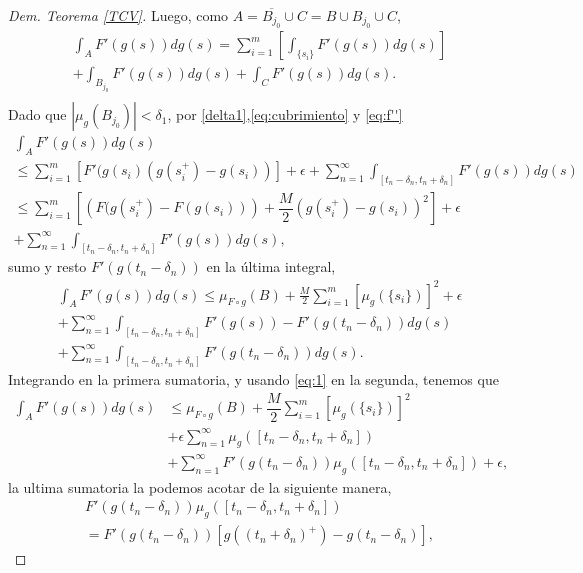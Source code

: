 \begin{proof}[Dem. Teorema \eqref{TCV}]
	Luego, como $A=\overline{B_{j_0}}\cup C=B\cup B_{j_0}\cup C$, 
	\begin{multline*}
		\int_{A}F'(g(s))dg(s)=\sum_{i=1}^{m}\left[ \int_{\{s_i\}}F'(g(s))dg(s)\right] \\+\int_{B_{j_0}}F'(g(s))dg(s)+\int_{C}F'(g(s))dg(s).\\
	\end{multline*}
Dado que  $|\mu_{g}(B_{j_0})|<\delta_1$, por \eqref{delta1},\eqref{eq:cubrimiento} y  \eqref{eq:f''}
		\begin{multline*}
			\int_{A}F'(g(s))dg(s)\\ \leq \sum_{i=1}^{m}\left[ F'(g(s_i)\left( g(s_i^+)-g(s_i)\right)  \right] +\epsilon+\sum_{n=1}^{\infty}\int_{[t_n-\delta_n, t_n+\delta_n]}F'(g(s))dg(s)\\ \leq 
		 \sum_{i=1}^{m}\left[ \left( F(g(s_i^+)-F(g(s_i))\right) +\dfrac{M}{2}\left( g(s_i^+)-g(s_i)\right)^2  \right] +\epsilon\\+\sum_{n=1}^{\infty}\int_{[t_n-\delta_n, t_n+\delta_n]}F'(g(s))dg(s),
\end{multline*}
sumo y resto $F'(g(t_n-\delta_n))$ en la última integral,
	\begin{multline*}
\int_{A}F'(g(s))dg(s) 
	\leq \mu_{F\circ g}(B)+\frac{M}{2}\sum_{i=1}^{m}\left[ \mu_{g}(\{s_i\})\right] ^2+\epsilon \\+ \sum_{n=1}^{\infty}\int_{[t_n-\delta_n, t_n+\delta_n]}F'(g(s))-F'(g(t_n-\delta_n))dg(s)\\
+\sum_{n=1}^{\infty}\int_{[t_n-\delta_n, t_n+\delta_n]}F'(g(t_n-\delta_n))dg(s).
	\end{multline*}
 Integrando en la primera sumatoria, y usando \eqref{eq:1} en la segunda,  tenemos que
	\begin{equation}\label{eq:3.2}
	\begin{split}
		\int_{A}F'(g(s))dg(s)	&\leq \mu_{F\circ g}(B)+\dfrac{M}{2}\sum_{i=1}^{m} \left[ \mu_{g}(\{s_i\})\right] ^2  \\ &+\epsilon\sum_{n=1}^{\infty}\mu_{g}\left( [t_n-\delta_n, t_n+\delta_n]\right) \\&+ \sum_{n=1}^{\infty}F'(g(t_n-\delta_n))\mu_{g}([t_n-\delta_n,t_n+\delta_n] ) +\epsilon,
	\end{split}
\end{equation}
la ultima sumatoria la podemos acotar de la siguiente manera, 
\begin{multline*}
F'(g(t_n-\delta_n))\mu_{g}([t_n-\delta_n,t_n+\delta_n] ) \\= F'(g(t_n-\delta_n))\left[g((t_n+\delta_n)^+)-g(t_n-\delta_n) \right] ,

\end{multline*}
\end{proof}
